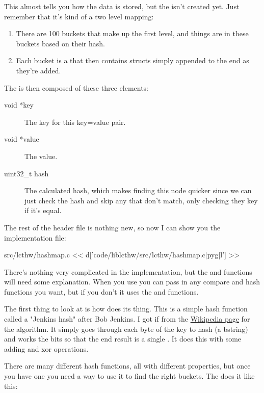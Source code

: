 This almost tells you how the data is stored, but the 
 isn't created yet.  Just remember that it's kind of a
two level mapping:

\begin{enumerate}
\item There are 100 buckets that make up the first level, and things are 
    in these buckets based on their hash.
\item Each bucket is a  that then contains 
    structs simply appended to the end as they're added.
\end{enumerate}

The  is then composed of these three elements:

\begin{description}
\item[void *key] The key for this key=value pair.
\item[void *value] The value.
\item[uint32\_t hash] The calculated hash, which makes finding this
    node quicker since we can just check the hash and skip any that
    don't match, only checking they key if it's equal.
\end{description}

The rest of the header file is nothing new, so now I can show you the
implementation  file:

\begin{code}{src/lcthw/hashmap.c}
<< d['code/liblcthw/src/lcthw/hashmap.c|pyg|l'] >>
\end{code}

There's nothing very complicated in the implementation, but the
 and  functions will need
some explanation.  When you use  you can pass in any
compare and hash functions you want, but if you don't it uses the
 and  functions.

The first thing to look at is how  does its thing.
This is a simple hash function called a "Jenkins hash" after Bob Jenkins.
I got if from the \href{http://en.wikipedia.org/wiki/Jenkins\_hash\_function}{Wikipedia page} for the algorithm.  It simply goes through each byte of the
key to hash (a bstring) and works the bits so that the end result is
a single .  It does this with some adding and xor operations.

There are many different hash functions, all with different properties,
but once you have one you need a way to use it to find the right buckets.
The  does it like this:

